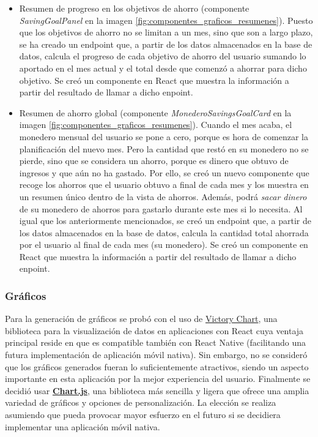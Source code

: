 \begin{itemize}
    \item Resumen de progreso en los objetivos de ahorro (componente \textit{SavingGoalPanel} en la imagen \ref{fig:componentes_graficos_resumenes}). Puesto que los objetivos de ahorro no se limitan a un mes, sino que son a largo plazo, se ha creado un endpoint que, a partir de los datos almacenados en la base de datos, calcula el progreso de cada objetivo de ahorro del usuario sumando lo aportado en el mes actual y el total desde que comenzó a ahorrar para dicho objetivo. Se creó un componente en React que muestra la información a partir del resultado de llamar a dicho enpoint.
    \item Resumen de ahorro global (componente \textit{MonederoSavingsGoalCard} en la imagen \ref{fig:componentes_graficos_resumenes}). Cuando el mes acaba, el monedero mensual del usuario se pone a cero, porque es hora de comenzar la planificación del nuevo mes. Pero la cantidad que restó en su monedero no se pierde, sino que se considera un ahorro, porque es dinero que obtuvo de ingresos y que aún no ha gastado. Por ello, se creó un nuevo componente que recoge los ahorros que el usuario obtuvo a final de cada mes y los muestra en un resumen único dentro de la vista de ahorros. Además, podrá \textit{sacar dinero} de su monedero de ahorros para gastarlo durante este mes si lo necesita. Al igual que los anteriormente mencionados, se creó un endpoint que, a partir de los datos almacenados en la base de datos, calcula la cantidad total ahorrada por el usuario al final de cada mes (su monedero). Se creó un componente en React que muestra la información a partir del resultado de llamar a dicho enpoint.

\end{itemize}


\subsubsection{Gráficos}
Para la generación de gráficos se probó con el uso de \href{https://commerce.nearform.com/open-source/victory/}{Victory Chart}, una biblioteca para la visualización de datos en aplicaciones con React cuya ventaja principal reside en que es compatible también con React Native (facilitando una futura implementación de aplicación móvil nativa). Sin embargo, no se consideró que los gráficos generados fueran lo suficientemente atractivos, siendo un aspecto importante en esta aplicación por la mejor experiencia del usuario. Finalmente se decidió usar \href{https://www.chartjs.org/}{\textbf{Chart.js}}, una biblioteca más sencilla y ligera que ofrece una amplia variedad de gráficos y opciones de personalización. La elección se realiza asumiendo que pueda provocar mayor esfuerzo en el futuro si se decidiera implementar una aplicación móvil nativa. 

